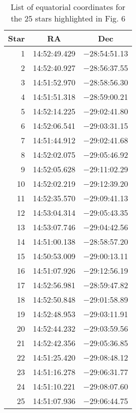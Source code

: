 \begin{table}
\begin{center}
\begin{tabular}{|r|l|l|}
\hline
  \multicolumn{1}{|c|}{Star} &
  \multicolumn{1}{c|}{RA} &
  \multicolumn{1}{c|}{Dec} \\
\hline
  1 & 14:52:49.429 & $-$28:54:51.13\\
  2 & 14:52:40.927 & $-$28:56:37.55\\
  3 & 14:51:52.970 & $-$28:58:56.30\\
  4 & 14:51:51.318 & $-$28:59:00.21\\
  5 & 14:52:14.225 & $-$29:02:41.80\\
  6 & 14:52:06.541 & $-$29:03:31.15\\
  7 & 14:51:44.912 & $-$29:02:41.68\\
  8 & 14:52:02.075 & $-$29:05:46.92\\
  9 & 14:52:05.628 & $-$29:11:02.29\\
  10 & 14:52:02.219 & $-$29:12:39.20\\
  11 & 14:52:35.570 & $-$29:09:41.13\\
  12 & 14:53:04.314 & $-$29:05:43.35\\
  13 & 14:53:07.746 & $-$29:04:42.56\\
  14 & 14:51:00.138 & $-$28:58:57.20\\
  15 & 14:50:53.009 & $-$29:00:13.11\\
  16 & 14:51:07.926 & $-$29:12:56.19\\
  17 & 14:52:56.981 & $-$28:59:47.82\\
  18 & 14:52:50.848 & $-$29:01:58.89\\
  19 & 14:52:48.953 & $-$29:03:11.91\\
  20 & 14:52:44.232 & $-$29:03:59.56\\
  21 & 14:52:42.356 & $-$29:05:36.85\\
  22 & 14:51:25.420 & $-$29:08:48.12\\
  23 & 14:51:16.278 & $-$29:06:31.77\\
  24 & 14:51:10.221 & $-$29:08:07.60\\
  25 & 14:51:07.936 & $-$29:06:44.75\\
\hline\end{tabular}
\caption{List of equatorial coordinates for the 25 stars highlighted in Fig. 6}
\end{center}
\end{table}


